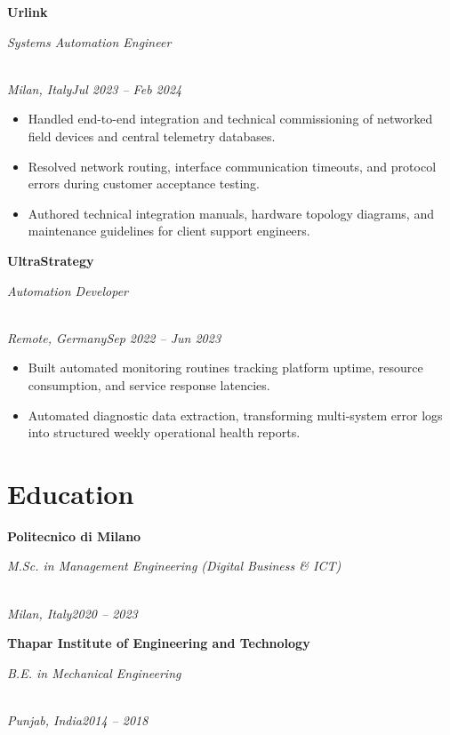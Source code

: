 \documentclass[a4paper,10pt]{article}
\newcommand{\role}[4]{\vspace{3pt}\noindent\hspace{0.6em}\parbox[t]{0.38\textwidth}{\raggedright\textbf{#1}}\hfill\parbox[t]{0.58\textwidth}{\raggedleft\textit{#2}}\\{\textit{#3}\hfill\textit{#4}}\vspace{1pt}}
\begin{document}
\role{Urlink}{Systems Automation Engineer}{Milan, Italy}{Jul 2023 -- Feb 2024}
\begin{itemize}
\item Handled end-to-end integration and technical commissioning of networked field devices and central telemetry databases.
\item Resolved network routing, interface communication timeouts, and protocol errors during customer acceptance testing.
\item Authored technical integration manuals, hardware topology diagrams, and maintenance guidelines for client support engineers.
\end{itemize}

\role{UltraStrategy}{Automation Developer}{Remote, Germany}{Sep 2022 -- Jun 2023}
\begin{itemize}
\item Built automated monitoring routines tracking platform uptime, resource consumption, and service response latencies.
\item Automated diagnostic data extraction, transforming multi-system error logs into structured weekly operational health reports.
\end{itemize}

\section{Education}
\role{Politecnico di Milano}{M.Sc. in Management Engineering (Digital Business \& ICT)}{Milan, Italy}{2020 -- 2023}
\role{Thapar Institute of Engineering and Technology}{B.E. in Mechanical Engineering}{Punjab, India}{2014 -- 2018}
\end{document}
